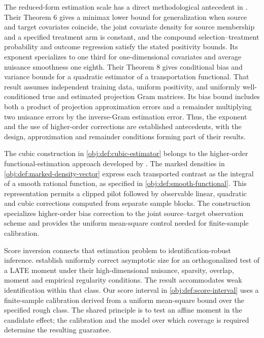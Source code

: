\documentclass[11pt]{article}
\begin{document}
The reduced-form estimation scale has a direct methodological antecedent in \citet[Theorems 6 and 8]{ZengKennedyBodnarNaimi2025Efficient}. Their Theorem 6 gives a minimax lower bound for generalization when source and target covariates coincide, the joint covariate density for source membership and a specified treatment arm is constant, and the compound selection--treatment probability and outcome regression satisfy the stated positivity bounds. Its exponent specializes to one third for one-dimensional covariates and average nuisance smoothness one eighth. Their Theorem 8 gives conditional bias and variance bounds for a quadratic estimator of a transportation functional. That result assumes independent training data, uniform positivity, and uniformly well-conditioned true and estimated projection Gram matrices. Its bias bound includes both a product of projection approximation errors and a remainder multiplying two nuisance errors by the inverse-Gram estimation error. Thus, the exponent and the use of higher-order corrections are established antecedents, with the design, approximation and remainder conditions forming part of their results.

The cubic construction in \cref{obj:def:cubic-estimator} belongs to the higher-order functional-estimation approach developed by \citet[Section 1]{Robins2008}. The marked densities in \cref{obj:def:marked-density-vector} express each transported contrast as the integral of a smooth rational function, as specified in \cref{obj:def:smooth-functional}. This representation permits a clipped pilot followed by observable linear, quadratic and cubic corrections computed from separate sample blocks. The construction specializes higher-order bias correction to the joint source--target observation scheme and provides the uniform mean-square control needed for finite-sample calibration.

Score inversion connects that estimation problem to identification-robust inference. \citet[Theorem 3.2]{Ma2026IdentificationRobust} establish uniformly correct asymptotic size for an orthogonalized test of a LATE moment under their high-dimensional nuisance, sparsity, overlap, moment and empirical regularity conditions. The result accommodates weak identification within that class. Our score interval in \cref{obj:def:score-interval} uses a finite-sample calibration derived from a uniform mean-square bound over the specified rough class. The shared principle is to test an affine moment in the candidate effect; the calibration and the model over which coverage is required determine the resulting guarantee.
\end{document}
